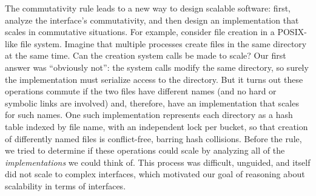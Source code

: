 \cbstart The commutativity rule leads to a new way to design scalable
software:
%
first, analyze the interface's commutativity, and then design an
implementation that
scales in commutative situations. \cbend
%
For example,
consider file creation in a POSIX-like file system. Imagine that
multiple processes create files in the same directory at the same
time. Can the creation system calls be made to scale? Our
first answer was ``obviously not'': the system calls modify the same
directory, so surely the implementation must
serialize access to the directory. But it turns
out these operations commute if the two files have different names
(and no hard or symbolic links are involved) and, therefore, have an
implementation that scales for such names.
One such implementation represents each directory as a hash table
indexed by file name, with an independent lock per bucket,
so that creation of differently named files is conflict-free, barring
hash collisions.
%
Before the rule, we tried to determine if these
operations could scale by analyzing all of the \emph{implementations}
we could think
of.  This process was difficult, unguided, and itself did not scale to
complex interfaces, which
motivated our goal of reasoning about
scalability in terms of interfaces.


